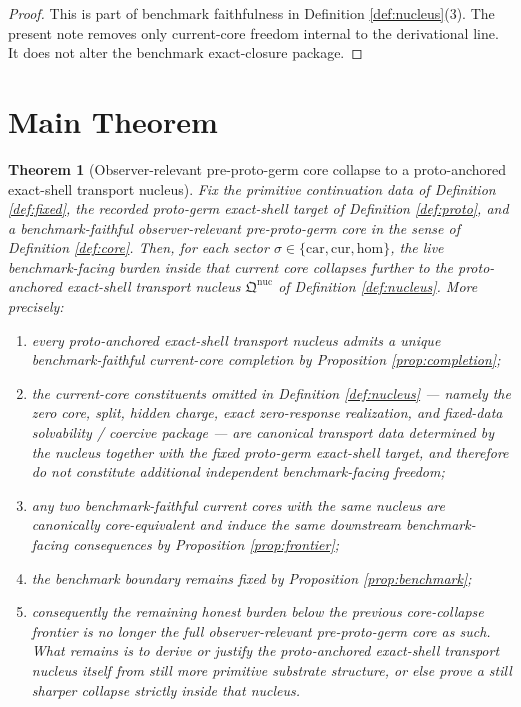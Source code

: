 \documentclass[11pt]{article}
\newcommand{\Car}{\mathrm{car}}
\newcommand{\Cur}{\mathrm{cur}}
\newcommand{\Hom}{\mathrm{hom}}
\newcommand{\PreProtoNucleus}{\mathfrak Q^{\mathrm{nuc}}}
\newtheorem{theorem}{Theorem}
\begin{document}
\begin{proof}
This is part of benchmark faithfulness in Definition \ref{def:nucleus}(3). The present note removes only current-core freedom internal to the derivational line. It does not alter the benchmark exact-closure package.
\end{proof}

\section{Main Theorem}

\begin{theorem}[Observer-relevant pre-proto-germ core collapse to a proto-anchored exact-shell transport nucleus]
\label{thm:main}
Fix the primitive continuation data of Definition \ref{def:fixed}, the recorded proto-germ exact-shell target of Definition \ref{def:proto}, and a benchmark-faithful observer-relevant pre-proto-germ core in the sense of Definition \ref{def:core}. Then, for each sector \(\sigma\in\{\Car,\Cur,\Hom\}\), the live benchmark-facing burden inside that current core collapses further to the proto-anchored exact-shell transport nucleus \(\PreProtoNucleus\) of Definition \ref{def:nucleus}. More precisely:
\begin{enumerate}
    \item every proto-anchored exact-shell transport nucleus admits a unique benchmark-faithful current-core completion by Proposition \ref{prop:completion};
    \item the current-core constituents omitted in Definition \ref{def:nucleus} --- namely the zero core, split, hidden charge, exact zero-response realization, and fixed-data solvability / coercive package --- are canonical transport data determined by the nucleus together with the fixed proto-germ exact-shell target, and therefore do not constitute additional independent benchmark-facing freedom;
    \item any two benchmark-faithful current cores with the same nucleus are canonically core-equivalent and induce the same downstream benchmark-facing consequences by Proposition \ref{prop:frontier};
    \item the benchmark boundary remains fixed by Proposition \ref{prop:benchmark};
    \item consequently the remaining honest burden below the previous core-collapse frontier is no longer the full observer-relevant pre-proto-germ core as such. What remains is to derive or justify the proto-anchored exact-shell transport nucleus itself from still more primitive substrate structure, or else prove a still sharper collapse strictly inside that nucleus.
\end{enumerate}
\end{theorem}
\end{document}
